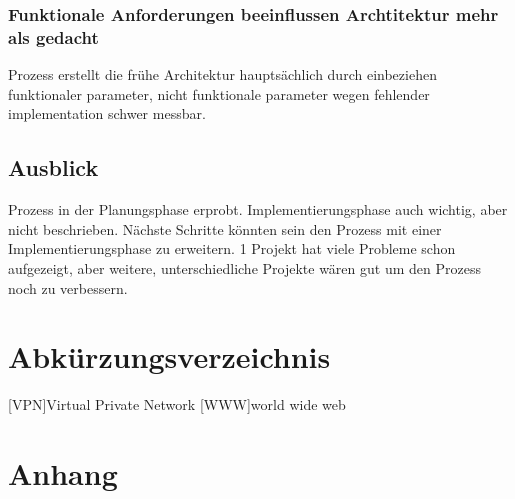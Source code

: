 \documentclass[Master,MSE,german]{twbook}
\newcommand{\listofcode}{\phantomsection\lstlistoflistings}
\begin{document}
\subsection{Funktionale Anforderungen beeinflussen Archtitektur mehr als gedacht}
Prozess erstellt die frühe Architektur hauptsächlich durch einbeziehen funktionaler parameter, nicht funktionale parameter wegen fehlender implementation schwer messbar.

\section{Ausblick}
Prozess in der Planungsphase erprobt. Implementierungsphase auch wichtig, aber nicht beschrieben. Nächste Schritte könnten sein den Prozess mit einer Implementierungsphase zu erweitern. 1 Projekt hat viele Probleme schon aufgezeigt, aber weitere, unterschiedliche Projekte wären gut um den Prozess noch zu verbessern.

\clearpage


\clearpage

\listoffigures
\clearpage

\listoftables
\clearpage

\listofcode
\clearpage

{}
\chapter*{Abkürzungsverzeichnis}
\begin{acronym}[XXXXX]
    [VPN]{Virtual Private Network}
    [WWW]{world wide web}
\end{acronym}
\clearpage

{}
\chapter*{Anhang}
\end{document}
